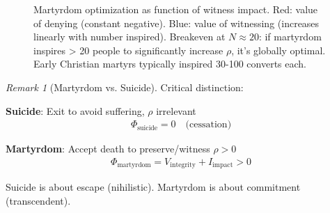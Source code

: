 \documentclass[11pt,a4paper]{article}
\theoremstyle{definition}
\theoremstyle{remark}
\newtheorem{remark}{Remark}[section]
\begin{document}
\begin{small}
\begin{enumerate}
\begin{figure}[H]
\caption{Martyrdom optimization as function of witness impact. Red: value of denying (constant negative). Blue: value of witnessing (increases linearly with number inspired). Breakeven at \(N \approx 20\): if martyrdom inspires > 20 people to significantly increase \(\rho\), it's globally optimal. Early Christian martyrs typically inspired 30-100 converts each.}
\label{fig:martyrdom_optimization}
\end{figure}

\begin{remark}[Martyrdom vs. Suicide]
Critical distinction:

\textbf{Suicide}: Exit to avoid suffering, \(\rho\) irrelevant
\begin{align}
\Phi_{\text{suicide}} = 0 \quad \text{(cessation)}
\end{align}

\textbf{Martyrdom}: Accept death to preserve/witness \(\rho > 0\)
\begin{align}
\Phi_{\text{martyrdom}} = V_{\text{integrity}} + I_{\text{impact}} > 0
\end{align}

Suicide is about escape (nihilistic). Martyrdom is about commitment (transcendent).


\end{remark}
\end{enumerate}
\end{small}
\end{document}
